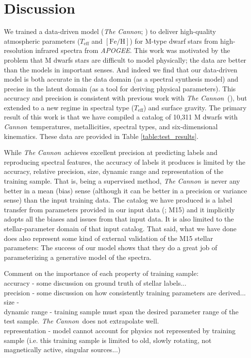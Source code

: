 \documentclass[modern]{aastex62}
\newcommand{\apogee}{\textsl{APOGEE}}
\newcommand{\thecannon}{\textsl{The Cannon}}
\newcommand{\cannon}{\textsl{Cannon}}
\newcommand{\teff}{T_{\mathrm{eff}}}
\newcommand{\feh}{[{\mathrm{Fe}/\mathrm{H}}]}
\begin{document}
\section{Discussion} \label{sec:discussion}

We trained a data-driven model (\thecannon; \citealt{Ness:2015}) to deliver
high-quality atmospheric parameters ($\teff$ and $\feh$) for M-type dwarf stars
from high-resolution infrared spectra from \apogee.
This work was motivated by the problem that M dwarfs stars are difficult to
model physically; the data are better than the models in important senses.
And indeed we find that our data-driven model is both accurate in the
data domain (as a spectral synthesis model) and precise in the latent domain
(as a tool for deriving physical parameters).
This accuracy and precision is consistent with previous work with
\thecannon\ (\citealt{Ness:2015, Casey:2016, Ho:2017a, Ness:2018}), but
extended to a new regime in spectral type ($\teff$) and surface
gravity.
The primary result of this work is that
we have compiled a catalog of 10,311 M dwarfs with \cannon\ temperatures,
metallicities, spectral types, and six-dimensional kinematics.
These data are provided in Table \ref{table:test_results}.

While \thecannon\ achieves excellent precision at predicting labels
and reproducing spectral features, the
accuracy of labels it produces is limited by
the accuracy, relative precision, size, dynamic range and
representation of the training sample.
That is, being a supervised method, \thecannon\ is never any better in a mean (bias) sense
(although it can be better in a precision or variance sense) than the input training
data.
The catalog we have produced is a label transfer from parameters provided
in our input data (\citealt{Mann:2015}; M15) and it implicitly adopts all the biases and
issues from that input data.
It is also limited to the stellar-parameter domain of that input catalog.
That said, what we have done does also represent some kind of external validation of the M15
stellar parameters:
The success of our model shows that they do a great job of parameterizing a generative
model of the spectra.

Comment on the importance of each property of training sample: \\
accuracy - some discussion on ground truth of stellar labels... \\
precision - some discussion on how consistently training parameters are derived... \\
size -  \\
dynamic range - training sample must span the desired parameter range of the test sample. \thecannon\ does not extrapolate well. \\
representation - model cannot account for physics not represented by training sample (i.e. this training sample is limited to old, slowly rotating, not magnetically active, singular sources...) \\
\end{document}
